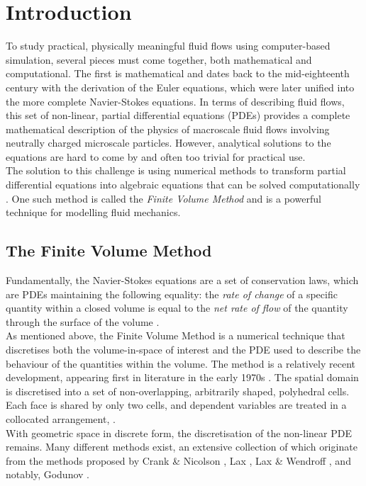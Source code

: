 \documentclass[final,3p,times,twocolumn]{elsarticle}
\begin{document}

\section{Introduction}
To study practical, physically meaningful fluid flows using computer-based simulation, several pieces must come together, both mathematical and computational. The first is mathematical and dates back to the mid-eighteenth century with the derivation of the Euler equations, which were later unified into the more complete Navier-Stokes equations. In terms of describing fluid flows, this set of non-linear, partial differential equations (PDEs) provides a complete mathematical description of the physics of macroscale fluid flows involving neutrally charged microscale particles. However, analytical solutions to the equations are hard to come by and often too trivial for practical use. \\
The solution to this challenge is using numerical methods to transform partial differential equations into algebraic equations that can be solved computationally \cite{Moukalled2016TheMethod}. One such method is called the \textit{Finite Volume Method} and is a powerful technique for modelling fluid mechanics.

\subsection{The Finite Volume Method}
Fundamentally, the Navier-Stokes equations are a set of conservation laws, which are PDEs maintaining the following equality: the \textit{rate of change} of a specific quantity within a closed volume is equal to the \textit{net rate of flow} of the quantity through the surface of the volume \cite{Versteeg2007AnEdition}. \\
As mentioned above, the Finite Volume Method is a numerical technique that discretises both the volume-in-space of interest and the PDE used to describe the behaviour of the quantities within the volume. The method is a relatively recent development, appearing first in literature in the early 1970s \cite{McDonaldPW2015TheCascades}.
The spatial domain is discretised into a set of non-overlapping, arbitrarily shaped, polyhedral cells. Each face is shared by only two cells, and dependent variables are treated in a collocated arrangement, \cite{Rhie1982NumericalSeparation} \cite{Peric1985ADucts.}. \\ With geometric space in discrete form, the discretisation of the non-linear PDE remains. Many different methods exist, an extensive collection of which originate from the methods proposed by Crank \& Nicolson \cite{Crank1947AType}, Lax \cite{Lax1954WeakComputation} \cite{Lax1957HyperbolicII}, Lax \& Wendroff \cite{Lax1960SystemsLaws}, and notably, Godunov \cite{Godunov1959FiniteDynamics}. 
\end{document}

